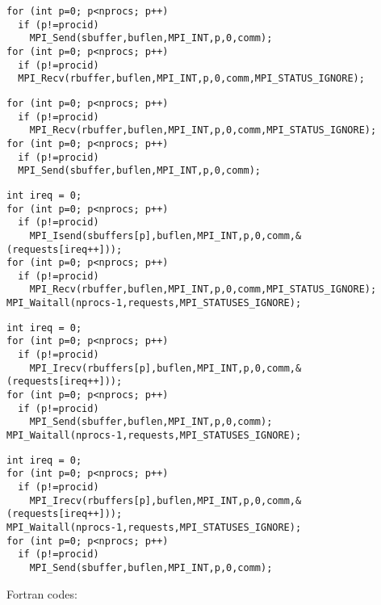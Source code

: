 \begin{enumerate}
    \lstset{language=C,basicstyle=\footnotesize\ttfamily}
\begin{lstlisting}
for (int p=0; p<nprocs; p++)
  if (p!=procid)
    MPI_Send(sbuffer,buflen,MPI_INT,p,0,comm);
for (int p=0; p<nprocs; p++)
  if (p!=procid)
  MPI_Recv(rbuffer,buflen,MPI_INT,p,0,comm,MPI_STATUS_IGNORE);
\end{lstlisting}
\begin{lstlisting}
for (int p=0; p<nprocs; p++)
  if (p!=procid)
    MPI_Recv(rbuffer,buflen,MPI_INT,p,0,comm,MPI_STATUS_IGNORE);
for (int p=0; p<nprocs; p++)
  if (p!=procid)
  MPI_Send(sbuffer,buflen,MPI_INT,p,0,comm);
\end{lstlisting}
\begin{lstlisting}
int ireq = 0;
for (int p=0; p<nprocs; p++)
  if (p!=procid)
    MPI_Isend(sbuffers[p],buflen,MPI_INT,p,0,comm,&(requests[ireq++]));
for (int p=0; p<nprocs; p++)
  if (p!=procid)
    MPI_Recv(rbuffer,buflen,MPI_INT,p,0,comm,MPI_STATUS_IGNORE);
MPI_Waitall(nprocs-1,requests,MPI_STATUSES_IGNORE);
\end{lstlisting}
\begin{lstlisting}
int ireq = 0;
for (int p=0; p<nprocs; p++)
  if (p!=procid)
    MPI_Irecv(rbuffers[p],buflen,MPI_INT,p,0,comm,&(requests[ireq++]));
for (int p=0; p<nprocs; p++)
  if (p!=procid)
    MPI_Send(sbuffer,buflen,MPI_INT,p,0,comm);
MPI_Waitall(nprocs-1,requests,MPI_STATUSES_IGNORE);
\end{lstlisting}
\begin{lstlisting}
int ireq = 0;
for (int p=0; p<nprocs; p++)
  if (p!=procid)
    MPI_Irecv(rbuffers[p],buflen,MPI_INT,p,0,comm,&(requests[ireq++]));
MPI_Waitall(nprocs-1,requests,MPI_STATUSES_IGNORE);
for (int p=0; p<nprocs; p++)
  if (p!=procid)
    MPI_Send(sbuffer,buflen,MPI_INT,p,0,comm);
\end{lstlisting}

    \pagebreak
    Fortran codes:
    
    \lstset{style=reviewcode,language=Fortran}


\end{enumerate}
